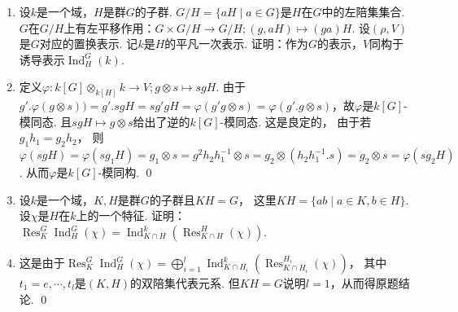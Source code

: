 \begin{enumerate}
        \item[13.3] 设$k$是一个域，$H$是群$G$的子群.
        $G/H = \{aH \mid a \in G\}$是$H$在$G$中的左陪集集合.
        $G$在$G/H$上有左平移作用：$G \times G/H \rightarrow G/H; (g,aH) \mapsto (ga)H$.
        设$(\rho,V)$是$G$对应的置换表示. 
        记$k$是$H$的平凡一次表示.
        证明：作为$G$的表示，$V$同构于诱导表示$\operatorname{Ind}_{H}^{G}(k)$.
        \item[\textbf{证明:}]
        定义$\varphi:k[G] \otimes_{k[H]} k \rightarrow V;g \otimes s \mapsto sgH$.
        由于
        $g'.\varphi(g \otimes s)) = g'.sgH = sg'gH = \varphi(g'g \otimes s)
        = \varphi(g'.g \otimes s)$，故$\varphi$是$k[G]$-模同态.
        且$sgH \mapsto g \otimes s$给出了逆的$k[G]$-模同态.
        这是良定的，
        由于若$g_{1}h_{1} = g_{2}h_{2}$，
        则$\varphi(sgH) = \varphi(sg_{1}H)
        = g_{1} \otimes s = g^{2}h_{2}h_{1}^{-1} \otimes s
        = g_{2} \otimes (h_{2}h_{1}^{-1}.s) = g_{2} \otimes s
        = \varphi(sg_{2}H)$. 从而$\varphi$是$k[G]$-模同构. \qed

    \item[13.4] 设$k$是一个域，$K,H$是群$G$的子群且$KH=G$，
    这里$KH=\{ab \mid a \in K,b \in H\}$.
    设$\chi$是$H$在$k$上的一个特征. 证明：
    $\operatorname{Res}_{K}^{G}\operatorname{Ind}_{H}^{G}(\chi)
    = \operatorname{Ind}_{K \cap H}^{k}(\operatorname{Res}_{K \cap H}^{H}(\chi))$.
    \item[\textbf{证明:}]
    这是由于$\operatorname{Res}_{K}^{G}\operatorname{Ind}_{H}^{G}(\chi)
    = \bigoplus\limits_{i=1}^{l}\operatorname{Ind}_{K \cap H_{i}}^{k}
    (\operatorname{Res}_{K \cap H_{i}}^{H_{i}}(\chi))$，
    其中$t_{1}=e,\cdots,t_{l}$是$(K,H)$的双陪集代表元系.
    但$KH = G$说明$l=1$，从而得原题结论. \qed


\end{enumerate}
